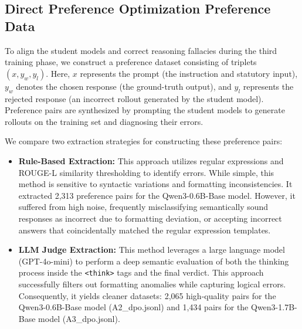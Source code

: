\subsection{Direct Preference Optimization Preference Data}

To align the student models and correct reasoning fallacies during the third training phase, we construct a preference dataset consisting of triplets $(x, y_w, y_l)$. Here, $x$ represents the prompt (the instruction and statutory input), $y_w$ denotes the chosen response (the ground-truth output), and $y_l$ represents the rejected response (an incorrect rollout generated by the student model). Preference pairs are synthesized by prompting the student models to generate rollouts on the training set and diagnosing their errors. 

We compare two extraction strategies for constructing these preference pairs:
\begin{itemize}
    \item \textbf{Rule-Based Extraction:} This approach utilizes regular expressions and ROUGE-L similarity thresholding to identify errors. While simple, this method is sensitive to syntactic variations and formatting inconsistencies. It extracted 2,313 preference pairs for the Qwen3-0.6B-Base model. However, it suffered from high noise, frequently misclassifying semantically sound responses as incorrect due to formatting deviation, or accepting incorrect answers that coincidentally matched the regular expression templates.
    \item \textbf{LLM Judge Extraction:} This method leverages a large language model (GPT-4o-mini) to perform a deep semantic evaluation of both the thinking process inside the \texttt{<think>} tags and the final verdict. This approach successfully filters out formatting anomalies while capturing logical errors. Consequently, it yields cleaner datasets: 2,065 high-quality pairs for the Qwen3-0.6B-Base model (A2\_dpo.jsonl) and 1,434 pairs for the Qwen3-1.7B-Base model (A3\_dpo.jsonl).
\end{itemize}
